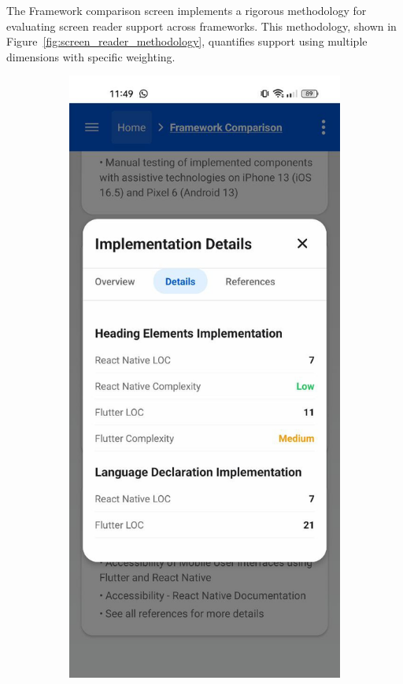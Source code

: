 The Framework comparison screen implements a rigorous methodology for evaluating screen reader support across frameworks. This methodology, shown in Figure~\ref{fig:screen_reader_methodology}, quantifies support using multiple dimensions with specific weighting.

\begin{figure}[ht]
    \centering
    \begin{subfigure}[b]{0.48\textwidth}
        \centering
        \includegraphics[width=\linewidth, alt={Screen reader support comparison methodology}]{img/methodology-details.jpg}

\end{subfigure}
\end{figure}
